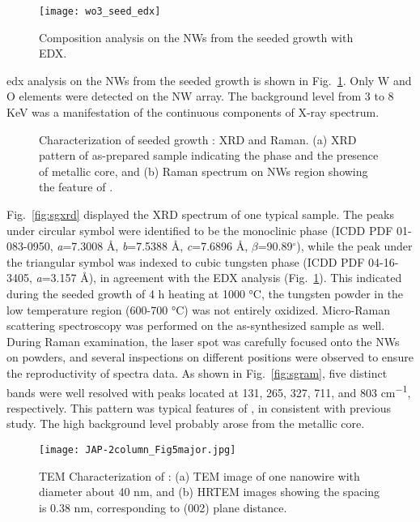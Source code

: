 \begin{figure}[htb]
\centering
\texttt{[image: wo3\_seed\_edx]}
\caption[Composition analysis on the  NWs from the seeded growth]{Composition analysis on the  NWs from the seeded growth with EDX.}
\label{fig:woedx}
\end{figure}
\gls{edx} analysis on the  NWs from the seeded growth is shown in Fig.~\ref{fig:woedx}. Only W and O elements were detected on the NW array. The background level from 3 to 8 KeV was a manifestation of the continuous components of X-ray spectrum. 

\begin{figure}[htb]
\centering
{}\hspace{0.04\textwidth}
\caption[Characterization of seeded growth : XRD and Raman]{Characterization of seeded growth : XRD and Raman. (a) XRD pattern of as-prepared sample indicating the  phase and the presence of metallic core, and (b) Raman spectrum on NWs region showing the feature of .}
\label{fig:woseedxrd}
\end{figure}

Fig.~\ref{fig:sgxrd} displayed the XRD spectrum of one typical sample. The peaks under circular symbol were identified to be the monoclinic  phase (ICDD PDF 01-083-0950, \emph{a}=7.3008 \AA, \emph{b}=7.5388 \AA, \emph{c}=7.6896 \AA, $\beta$=90.89$^\circ$), while the peak under the triangular symbol was indexed to cubic tungsten phase (ICDD PDF 04-16-3405, \emph{a}=3.157 \AA), in agreement with the EDX analysis (Fig.~\ref{fig:woedx}). This indicated during the  seeded growth of 4 h heating at 1000 \si{\degreeCelsius}, the tungsten powder in the low temperature region (600-700 \si{\degreeCelsius}) was not entirely oxidized. Micro-Raman scattering spectroscopy was performed on the as-synthesized sample as well. During Raman examination, the laser spot was carefully focused onto the NWs on powders, and several inspections on different positions were observed to ensure the reproductivity of spectra data. As shown in Fig.~\ref{fig:sgram}, five distinct bands were well resolved with peaks located at 131, 265, 327, 711, and 803 \si{cm^{-1}}, respectively. This pattern was typical features of , in consistent with previous study.\cite{Salje1975a,Dixit1986} The high background level probably arose from the metallic core.
\begin{figure}[htb]
\centering
\texttt{[image: JAP-2column\_Fig5major.jpg]}
\caption[Characterization of : TEM]{TEM Characterization of : (a) TEM image of one nanowire with diameter about 40 nm, and (b) HRTEM images showing the spacing is 0.38 nm, corresponding to (002) plane distance.}
\label{fig:woseedtem1}
\end{figure}

